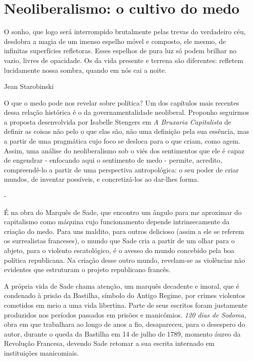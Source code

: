 \section{Neoliberalismo: o cultivo do medo}

\epigraph{O sonho, que logo será interrompido brutalmente pelas trevas do
verdadeiro céu, desdobra a magia de um imenso espelho móvel e composto,
ele mesmo, de infinitas superfícies refletoras. Esses espelhos de pura
luz só podem brilhar no vazio, livres de opacidade. Os da vida presente
e terrena são diferentes: refletem lucidamente nossa sombra, quando em
nós cai a noite.}{Jean Starobinski}

O que o medo pode nos revelar sobre política? Um dos capítulos mais
recentes dessa relação histórica é o da governamentalidade neoliberal.
Proponho seguirmos a proposta desenvolvida por Isabelle Stengers em
\emph{A Bruxaria Capitalista} de definir as coisas não pelo o que elas
são, não uma definição pela sua essência, mas a partir de uma pragmática
cujo foco se desloca para o que criam, como agem. Assim, uma análise do
neoliberalismo sob o viés dos sentimentos que ele é capaz de engendrar -
enfocando aqui o sentimento de medo - permite, acredito, compreendê-lo a
partir de uma perspectiva antropológica: o seu poder de criar mundos, de
inventar possíveis, e concretizá-los ao dar-lhes forma.

-

É na obra do Marquês de Sade, que encontro um ângulo para me aproximar
do capitalismo como máquina cujo funcionamento depende intrinsecamente
da criação do medo. Para uns maldito, para outros delicioso (assim a ele
se referem os surrealistas franceses), o mundo que Sade cria a partir de
um olhar para o abjeto, para o violento escatológico, é o avesso do
mundo concebido pela boa política republicana. Na criação desse outro
mundo, revelam-se as violências não evidentes que estruturam o projeto
republicano francês.

A própria vida de Sade chama atenção, um marquês decadente e imoral, que
é condenado à prisão da Bastilha, símbolo do Antigo Regime, por crimes
violentos cometidos em meio a uma vida libertina. Parte de seus escritos
foram justamente produzidos nos períodos passados em prisões e
manicômios. \emph{120 dias de Sodoma,} obra em que trabalhara ao longo
de anos a fio, desapareceu, para o desespero do autor, durante o queda
da Bastilha em 14 de julho de 1789, momento áureo da Revolução Francesa,
devendo Sade retomar a sua escrita internado em instituições
manicomiais.

